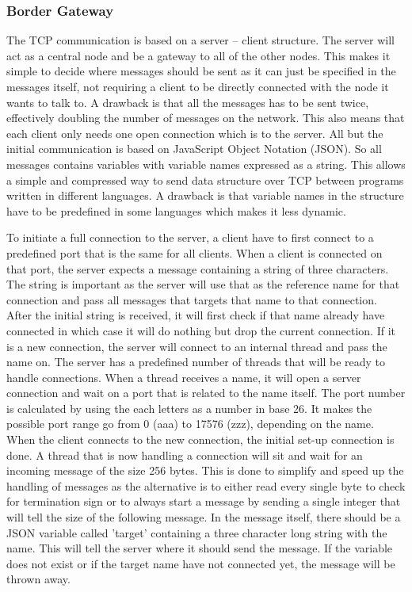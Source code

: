\subsubsection{Border Gateway} %
\noindent The TCP communication is based on a server – client structure. The server will act as a central node and be a gateway to all of the other nodes. This makes it simple to decide where messages should be sent as it can just be specified in the messages itself, not requiring a client to be directly connected with the node it wants to talk to. A drawback is that all the messages has to be sent twice, effectively doubling the number of messages on the network. This also means that each client only needs one open connection which is to the server. All but the initial communication is based on JavaScript Object Notation (JSON). So all messages contains variables with variable names expressed as a string. This allows a simple and compressed way to send data structure over TCP between programs written in different languages. A drawback is that variable names in the structure have to be predefined in some languages which makes it less dynamic. 

\noindent To initiate a full connection to the server, a client have to first connect to a predefined port that is the same for all clients. When a client is connected on that port, the server expects a message containing a string of three characters. The string is important as the server will use that as the reference name for that connection and pass all messages that targets that name to that connection. After the initial string is received, it will first check if that name already have connected in which case it will do nothing but drop the current connection. If it is a new connection, the server will connect to an internal thread and pass the name on. The server has a predefined number of threads that will be ready to handle connections. When a thread receives a name, it will open a server connection and wait on a port that is related to the name itself. The port number is calculated by using the each letters as a number in base 26. It makes the possible port range go from 0 (aaa) to 17576 (zzz), depending on the name. When the client connects to the new connection, the initial set-up connection is done. A thread that is now handling a connection will sit and wait for an incoming message of the size 256 bytes. This is done to simplify and speed up the handling of messages as the alternative is to either read every single byte to check for termination sign or to always start a message by sending a single integer that will tell the size of the following message. In the message itself, there should be a JSON variable called 'target' containing a three character long string with the name. This will tell the server where it should send the message. If the variable does not exist or if the target name have not connected yet, the message will be thrown away. 

